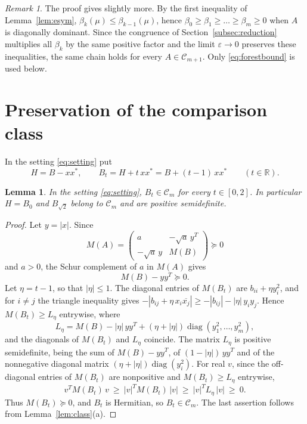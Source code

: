 \documentclass[11pt]{amsart}
\newtheorem{lemma}[theorem]{Lemma}
\theoremstyle{remark}
\newtheorem{remark}[theorem]{Remark}
\numberwithin{equation}{section}
\newcommand{\diag}{\operatorname{diag}}
\newcommand{\cC}{\mathcal{C}}
\newcommand{\R}{\mathbb{R}}
\newcommand{\conj}[1]{\overline{#1}}
\begin{document}
\begin{remark}\label{rem:forest}
The proof gives slightly more. By the first inequality of Lemma~\ref{lem:esym}, $\beta_k(\mu)\le\beta_{k-1}(\mu)$, hence $\beta_0\ge\beta_1\ge\dots\ge\beta_m\ge0$ when $A$ is diagonally dominant. Since the congruence of Section~\ref{subsec:reduction} multiplies all $\beta_k$ by the same positive factor and the limit $\varepsilon\to0$ preserves these inequalities, the same chain holds for every $A\in\cC_{m+1}$. Only \eqref{eq:forestbound} is used below.
\end{remark}

\section{Preservation of the comparison class}\label{sec:closure}

In the setting \eqref{eq:setting} put
\[
H=B-xx^*,\qquad B_t=H+t\,xx^*=B+(t-1)\,xx^*\qquad(t\in\R).
\]

\begin{lemma}\label{lem:closure}
In the setting \eqref{eq:setting}, $B_t\in\cC_m$ for every $t\in[0,2]$. In particular $H=B_0$ and $B_{\sqrt2}$ belong to $\cC_m$ and are positive semidefinite.
\end{lemma}

\begin{proof}
Let $y=|x|$. Since
\[
M(A)=\begin{pmatrix}a&-\sqrt a\,y^T\\ -\sqrt a\,y&M(B)\end{pmatrix}\succeq0
\]
and $a>0$, the Schur complement of $a$ in $M(A)$ gives
\begin{equation}\label{eq:schur}
M(B)-yy^T\succeq0 .
\end{equation}
Let $\eta=t-1$, so that $|\eta|\le1$. The diagonal entries of $M(B_t)$ are $b_{ii}+\eta y_i^2$, and for $i\ne j$ the triangle inequality gives $-|b_{ij}+\eta\,x_i\conj{x_j}|\ge-|b_{ij}|-|\eta|\,y_iy_j$. Hence $M(B_t)\ge L_\eta$ entrywise, where
\[
L_\eta=M(B)-|\eta|\,yy^T+(\eta+|\eta|)\diag(y_1^2,\dots,y_m^2),
\]
and the diagonals of $M(B_t)$ and $L_\eta$ coincide. The matrix $L_\eta$ is positive semidefinite, being the sum of $M(B)-yy^T$, of $(1-|\eta|)\,yy^T$ and of the nonnegative diagonal matrix $(\eta+|\eta|)\diag(y_i^2)$. For real $v$, since the off-diagonal entries of $M(B_t)$ are nonpositive and $M(B_t)\ge L_\eta$ entrywise,
\[
v^TM(B_t)\,v\ \ge\ |v|^TM(B_t)\,|v|\ \ge\ |v|^TL_\eta\,|v|\ \ge\ 0 .
\]
Thus $M(B_t)\succeq0$, and $B_t$ is Hermitian, so $B_t\in\cC_m$. The last assertion follows from Lemma~\ref{lem:class}(a).
\end{proof}
\end{document}
